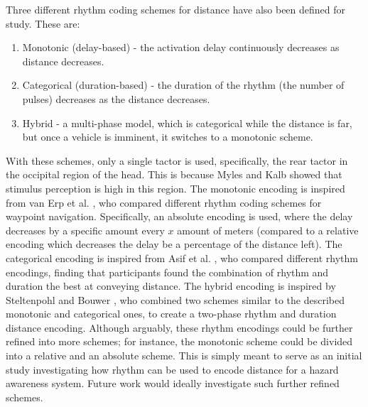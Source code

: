 \documentclass{interim}
\begin{document}
Three different rhythm coding schemes for distance have also been defined for study. These are:
\begin{enumerate}
    \item Monotonic (delay-based) - the activation delay continuously decreases as distance decreases.
    \item Categorical (duration-based) - the duration of the rhythm (the number of pulses) decreases as the distance decreases.
    \item Hybrid - a multi-phase model, which is categorical while the distance is far, but once a vehicle is imminent, it switches to a monotonic scheme.
\end{enumerate}
With these schemes, only a single tactor is used, specifically, the rear tactor in the occipital region of the head. This is because Myles and Kalb \cite{headguidelines} showed that stimulus perception is high in this region.
The monotonic encoding is inspired from van Erp et al. \cite{10.1145/1060581.1060585}, who compared different rhythm coding schemes for waypoint navigation. Specifically, an absolute encoding is used, where the delay decreases by a specific amount every $x$ amount of meters (compared to a relative encoding which decreases the delay be a percentage of the distance left). The categorical encoding is inspired from Asif et al. \cite{10.1145/1868914.1868923}, who compared different rhythm encodings, finding that participants found the combination of rhythm and duration the best at conveying distance. The hybrid encoding is inspired by Steltenpohl and Bouwer \cite{10.1145/2449396.2449450}, who combined two schemes similar to the described monotonic and categorical ones, to create a two-phase rhythm and duration distance encoding. Although arguably, these rhythm encodings could be further refined into more schemes; for instance, the monotonic scheme could be divided into a relative and an absolute scheme. This is simply meant to serve as an initial study investigating how rhythm can be used to encode distance for a hazard awareness system. Future work would ideally investigate such further refined schemes.
\end{document}
